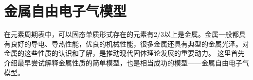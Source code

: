 %
%
\section{金属自由电子气模型}\label{Section:Free-electron}
在元素周期表中，可以固态单质形式存在的元素有2/3以上是金属。金属一般都具有良好的导电、导热性能，优良的机械性能，很多金属还具有典型的金属光泽。对金属的这些性质的认识和了解，是推动现代固体理论发展的重要动力。
这里首先介绍最早尝试解释金属性质的简单模型，也是相当成功的模型——金属自由电子气模型。 

